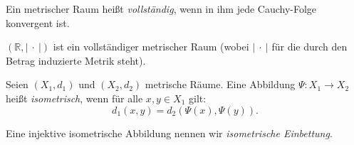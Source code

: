 \documentclass[10pt]{scrbook}
\begin{document}
\begin{Def}
Ein metrischer Raum heißt \emph{vollständig}, wenn in ihm jede Cauchy-Folge konvergent ist.
\end{Def}

\begin{Sa}
$\left(\mathbb{R}, \left|\ \cdot\ \right|\right)$ ist ein vollständiger metrischer Raum (wobei $\left|\ \cdot\ \right|$ für die durch den Betrag induzierte Metrik steht).
\end{Sa}

\begin{Def}
Seien $(X_1, d_1)$ und $(X_2, d_2)$ metrische Räume. Eine Abbildung $\Psi: X_1 \rightarrow X_2$ heißt \emph{isometrisch}, wenn für alle $x, y\in X_1$ gilt:
\begin{equation}
d_1(x, y) = d_2(\Psi(x), \Psi(y)).
\label{eq:isometrische_abbildung}
\end{equation}
\end{Def}

\begin{Def}
Eine injektive isometrische Abbildung nennen wir \emph{isometrische Einbettung}.
\end{Def}
\end{document}
